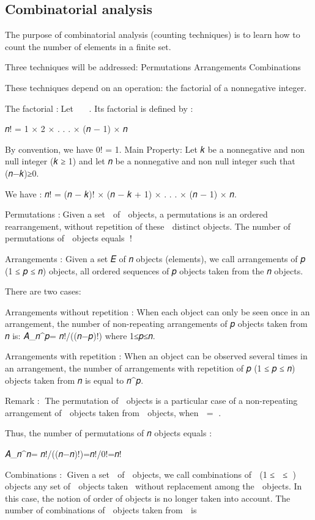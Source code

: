 \documentclass[
  letterpaper,
  DIV=11,
  numbers=noendperiod]{scrreprt}
\begin{document}
\subsection{Combinatorial analysis}\label{combinatorial-analysis}

The purpose of combinatorial analysis (counting techniques) is to learn
how to count the number of elements in a finite set.

Three techniques will be addressed: Permutations Arrangements
Combinations

These techniques depend on an operation: the factorial of a nonnegative
integer.

The factorial :Let 𝑛 ∈ 𝑁. Its factorial is defined by :

𝑛! = 1 × 2 × . . . × (𝑛 − 1) × 𝑛

By convention, we have 0! = 1. Main Property: Let 𝑘 be a nonnegative and
non null integer (𝑘 ≥ 1) and let 𝑛 be a nonnegative and non null integer
such that (𝑛−𝑘)≥0.

We have : 𝑛! = (𝑛 − 𝑘)! × (𝑛 − 𝑘 + 1) × . . . × (𝑛 − 1) × 𝑛.

Permutations :Given a set 𝐸 of 𝑛 objects, a permutations is an ordered
rearrangement, without repetition of these 𝑛 distinct objects. The
number of permutations of 𝑛 objects equals 𝑛!

Arrangements : Given a set 𝐸 of 𝑛 objects (elements), we call
arrangements of 𝑝 (1 ≤ 𝑝 ≤ 𝑛) objects, all ordered sequences of 𝑝
objects taken from the 𝑛 objects.

There are two cases:

Arrangements without repetition : When each object can only be seen once
in an arrangement, the number of non-repeating arrangements of 𝑝 objects
taken from 𝑛 is: 𝐴\_𝑛\^{}𝑝= 𝑛!/((𝑛−𝑝)!) where 1≤𝑝≤𝑛.

Arrangements with repetition : When an object can be observed several
times in an arrangement, the number of arrangements with repetition of 𝑝
(1 ≤ 𝑝 ≤ 𝑛) objects taken from 𝑛 is equal to 𝑛\^{}𝑝.

Remark : The permutation of 𝑛 objects is a particular case of a
non-repeating arrangement of 𝑝 objects taken from 𝑛 objects, when 𝑝 = 𝑛.

Thus, the number of permutations of 𝑛 objects equals :

𝐴\_𝑛\^{}𝑛= 𝑛!/((𝑛−𝑛)!)=𝑛!/0!=𝑛!

Combinations : Given a set 𝐸 of 𝑛 objects, we call combinations of 𝑝 (1
≤ 𝑝 ≤ 𝑛) objects any set of 𝑝 objects taken ~without replacement among
the 𝑛 objects. In this case, the notion of order of objects is no longer
taken into account. The number of combinations of 𝑝 objects taken from 𝑛
is
\end{document}
